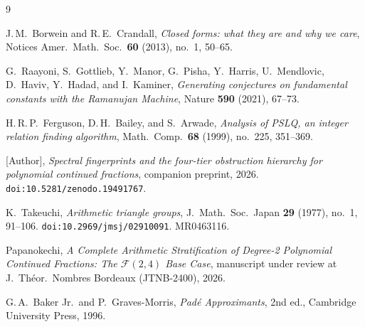 \documentclass[11pt]{amsart}
\theoremstyle{plain}
\theoremstyle{remark}
\begin{document}
\begin{thebibliography}{9}

J.\,M.~Borwein and R.\,E.~Crandall,
\emph{Closed forms: what they are and why we care},
Notices Amer.\ Math.\ Soc.\ \textbf{60} (2013), no.~1, 50--65.

G.~Raayoni, S.~Gottlieb, Y.~Manor, G.~Pisha, Y.~Harris,
U.~Mendlovic, D.~Haviv, Y.~Hadad, and I.~Kaminer,
\emph{Generating conjectures on fundamental constants with
the Ramanujan Machine},
Nature \textbf{590} (2021), 67--73.

H.\,R.\,P.~Ferguson, D.\,H.~Bailey, and S.~Arwade,
\emph{Analysis of PSLQ, an integer relation finding algorithm},
Math.\ Comp.\ \textbf{68} (1999), no.~225, 351--369.

[Author],
\emph{Spectral fingerprints and the four-tier obstruction
hierarchy for polynomial continued fractions},
companion preprint, 2026.
\texttt{doi:10.5281/zenodo.19491767}.

K.~Takeuchi,
\emph{Arithmetic triangle groups},
J.\ Math.\ Soc.\ Japan \textbf{29} (1977), no.~1, 91--106.
\texttt{doi:10.2969/jmsj/02910091}.
MR0463116.

Papanokechi,
\emph{A Complete Arithmetic Stratification of Degree-2 Polynomial
Continued Fractions: The $\mathcal{F}(2,4)$ Base Case},
manuscript under review at J.\ Th\'{e}or.\ Nombres Bordeaux
(JTNB-2400), 2026.

G.\,A.~Baker Jr.\ and P.~Graves-Morris,
\emph{Pad\'{e} Approximants}, 2nd ed.,
Cambridge University Press, 1996.

\end{thebibliography}
\end{document}
